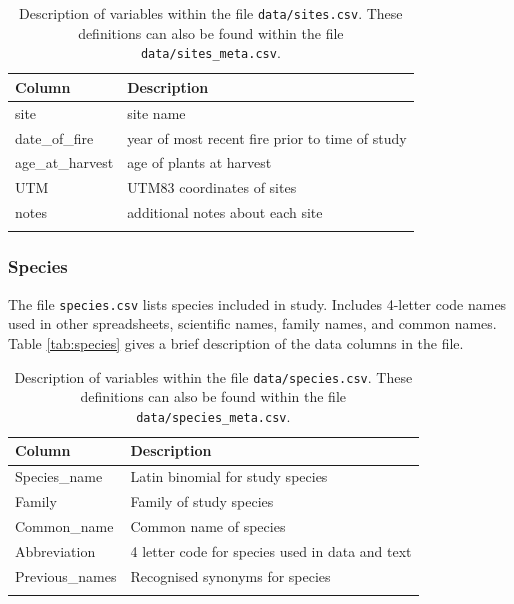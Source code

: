 \documentclass[10pt,twoside]{article}\usepackage[]{graphicx}\usepackage[]{color}
\begin{document}
\begingroup\small
\begin{longtable}{p{6cm}p{10cm}}
\caption{Description of variables within the file \texttt{data/sites.csv}. These definitions can also be found within the file \texttt{data/sites\_meta.csv}.} \\ 
  \hline
Column & Description \\ 
  \hline
site & site name \\ 
  date\_of\_fire & year of most recent fire prior to time of study \\ 
  age\_at\_harvest & age of plants at harvest \\ 
  UTM & UTM83 coordinates of sites \\ 
  notes & additional notes about each site \\ 
   \hline
\hline
\label{tab:sites_meta}
\end{longtable}
\endgroup


\subsubsection{Species}
The file \texttt{species.csv} lists species included in study. Includes 4-letter code names used in other spreadsheets, scientific names, family names, and common names. Table \ref{tab:species} gives a brief description of the data columns in the file.

\begingroup\small
\begin{longtable}{p{6cm}p{10cm}}
\caption{Description of variables within the file \texttt{data/species.csv}. These definitions can also be found within the file \texttt{data/species\_meta.csv}.} \\ 
  \hline
Column & Description \\ 
  \hline
Species\_name & Latin binomial for study species \\ 
  Family & Family of study species \\ 
  Common\_name & Common name of species \\ 
  Abbreviation & 4 letter code for species used in data and text \\ 
  Previous\_names & Recognised synonyms for species \\ 
   \hline
\hline
\label{tab:species_meta}
\end{longtable}
\endgroup


\clearpage
\end{document}
